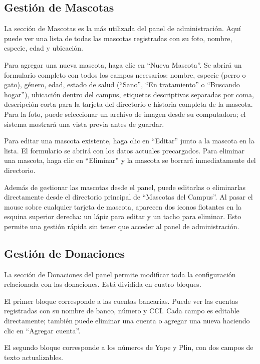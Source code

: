 \documentclass[12pt,a4paper]{article}
\begin{document}
\subsection{Gestión de Mascotas}

La sección de Mascotas es la más utilizada del panel de administración. Aquí puede ver una lista de todas las mascotas registradas con su foto, nombre, especie, edad y ubicación.

Para agregar una nueva mascota, haga clic en ``Nueva Mascota''. Se abrirá un formulario completo con todos los campos necesarios: nombre, especie (perro o gato), género, edad, estado de salud (``Sano'', ``En tratamiento'' o ``Buscando hogar''), ubicación dentro del campus, etiquetas descriptivas separadas por coma, descripción corta para la tarjeta del directorio e historia completa de la mascota. Para la foto, puede seleccionar un archivo de imagen desde su computadora; el sistema mostrará una vista previa antes de guardar.

Para editar una mascota existente, haga clic en ``Editar'' junto a la mascota en la lista. El formulario se abrirá con los datos actuales precargados. Para eliminar una mascota, haga clic en ``Eliminar'' y la mascota se borrará inmediatamente del directorio.

Además de gestionar las mascotas desde el panel, puede editarlas o eliminarlas directamente desde el directorio principal de ``Mascotas del Campus''. Al pasar el mouse sobre cualquier tarjeta de mascota, aparecen dos iconos flotantes en la esquina superior derecha: un lápiz para editar y un tacho para eliminar. Esto permite una gestión rápida sin tener que acceder al panel de administración.

\subsection{Gestión de Donaciones}

La sección de Donaciones del panel permite modificar toda la configuración relacionada con las donaciones. Está dividida en cuatro bloques.

El primer bloque corresponde a las cuentas bancarias. Puede ver las cuentas registradas con su nombre de banco, número y CCI. Cada campo es editable directamente; también puede eliminar una cuenta o agregar una nueva haciendo clic en ``Agregar cuenta''.

El segundo bloque corresponde a los números de Yape y Plin, con dos campos de texto actualizables.
\end{document}
